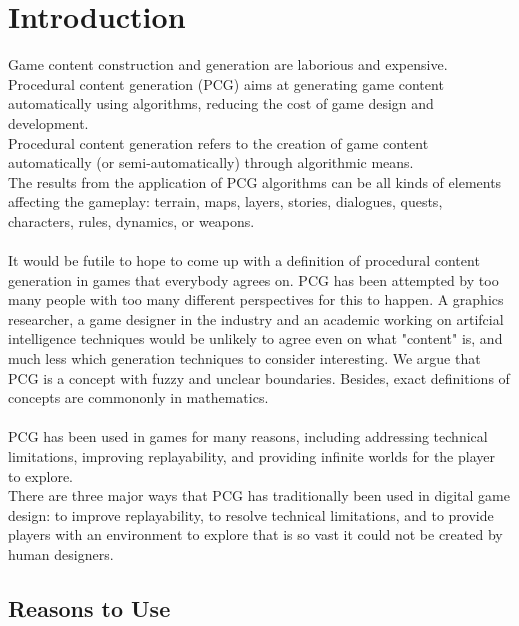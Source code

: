 \documentclass[MGS,Master,english]{twbook}%
\begin{document}
\section{Introduction}
\cite{pcg::PCGinGameIndustry} Game content construction and generation are laborious and expensive. Procedural content generation (PCG) aims at generating game content automatically using algorithms, reducing the cost of game design and development.\\
Procedural content generation refers to the creation of game content automatically (or semi-automatically) through algorithmic means.\\
The results from the application of PCG algorithms can be all kinds of elements affecting the gameplay: terrain, maps, layers, stories, dialogues, quests, characters, rules, dynamics, or weapons.\\
\\
It would be futile to hope to come up with a definition of procedural content generation in games that everybody agrees on. PCG has been attempted by too many people with too many different perspectives for this to happen. A graphics researcher, a game designer in the industry and an academic working on artifcial intelligence techniques would be unlikely to agree even on what "content" is, and much less which generation techniques to consider interesting. We argue that PCG is a concept with fuzzy and unclear boundaries. Besides, exact definitions of concepts are commononly in mathematics. \cite{pcg::whatIsPCG}\\
\\
PCG has been used in games for many reasons, including addressing technical limitations, improving replayability, and providing infinite worlds for the player to explore. \cite{pcg::endlessWeb}\\
There are three major ways that PCG has traditionally been used in digital game design: to improve replayability, to resolve technical limitations, and to provide players with an environment to explore that is so vast it could not be created by human designers.\cite{pcg::endlessWeb}

\subsection{Reasons to Use}
\end{document}

